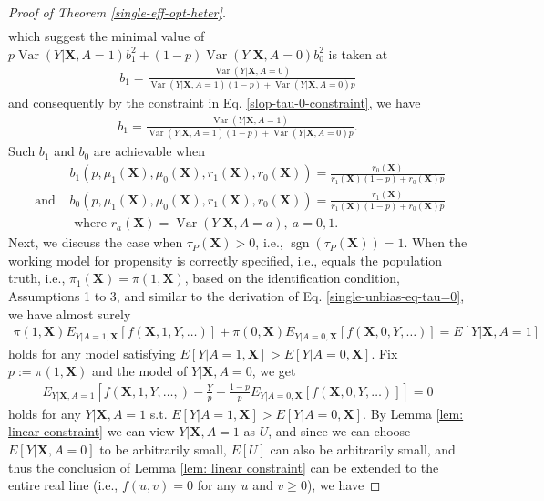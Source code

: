 \documentclass[11pt]{article}
\theoremstyle{referenceplain}
\theoremstyle{referencedefinition}
\theoremstyle{referenceremark}
\begin{document}
\begin{proof}[Proof of Theorem \ref{single-eff-opt-heter}]
\begin{align*}
    \end{align*}
    which suggest the minimal value of $p \operatorname{Var}(Y|\mathbf{X},A=1)b_1^2 + (1-p)\operatorname{Var}(Y|\mathbf{X},A=0)b_0^2$ is taken at
    \begin{align*}
        b_1 = \frac{\operatorname{Var}(Y|\mathbf{X},A=0)}{\operatorname{Var}(Y|\mathbf{X},A=1)(1-p)+\operatorname{Var}(Y|\mathbf{X},A=0)p}
    \end{align*}
    and consequently by the constraint in Eq. \eqref{slop-tau-0-constraint}, we have
    \begin{align*}
         b_1 = \frac{\operatorname{Var}(Y|\mathbf{X},A=1)}{\operatorname{Var}(Y|\mathbf{X},A=1)(1-p)+\operatorname{Var}(Y|\mathbf{X},A=0)p}.
    \end{align*}
Such $b_1$ and $b_0$ are achievable when
\begin{align*}
        &b_1(p,\mu_1(\mathbf{X}),\mu_0(\mathbf{X}),r_1(\mathbf{X}),r_0(\mathbf{X})) =  \frac{r_0(\mathbf{X})}{r_1(\mathbf{X}) (1-p)+r_0(\mathbf{X}) p}\\
        \text{ and }&b_0(p,\mu_1(\mathbf{X}),\mu_0(\mathbf{X}),r_1(\mathbf{X}),r_0(\mathbf{X})) =  \frac{r_1(\mathbf{X})}{r_1(\mathbf{X}) (1-p)+r_0(\mathbf{X}) p}\\
        &\text{ where }r_a(\mathbf{X}) = \operatorname{Var}(Y|\mathbf{X},A=a),~a=0,1.
\end{align*}
Next, we discuss the case when $\tau_P(\mathbf{X})>0$, i.e., $\operatorname{sgn}\left(\tau_P\left(\mathbf{X}\right)\right)=1$. When the working model for propensity is correctly specified, i.e., equals the population truth, i.e., $\pi_1(\mathbf{X}) = \pi(1,\mathbf{X})$, based on the identification condition, Assumptions 1 to 3, and similar to the derivation of Eq. \eqref{single-unbias-eq-tau=0}, we have almost surely 
\begin{align}\label{single-unbias-eq-tau>0}
   \pi(1,\mathbf{X})E_{Y|A=1,\mathbf{X}}[ f(\mathbf{X},1,Y,\dots)] + \pi(0,\mathbf{X}) E_{Y|A=0,\mathbf{X}}[ f(\mathbf{X},0,Y,\dots)] = E[Y|\mathbf{X},A=1]
\end{align}
holds for any model satisfying $E[Y|A=1,\mathbf{X}] > E[Y|A=0,\mathbf{X}]$. Fix $p:= \pi(1,\mathbf{X})$ and the model of $Y|\mathbf{X},A=0$, we get
\begin{align}
    E_{Y|\mathbf{X},A=1}\left[f(\mathbf{X},1,Y,\dots,)-\frac{Y}{p} + \frac{1-p}{p}E_{Y|A=0,\mathbf{X}}[ f(\mathbf{X},0,Y,\dots)]\right]=0
\end{align}
holds for any  $Y|\mathbf{X},A=1$ s.t. $E[Y|A=1,\mathbf{X}] > E[Y|A=0,\mathbf{X}]$. By Lemma \ref{lem: linear constraint} we can view $Y|\mathbf{X},A=1$ as $U$,  and since we can choose $E[Y|\mathbf{X},A=0]$ to be arbitrarily small, $E[U]$ can also be arbitrarily small, and thus the conclusion of Lemma \ref{lem: linear constraint} can be extended to the entire real line (i.e., $f(u,v)=0$ for any $u$ and $v\ge 0$), we have

\end{proof}
\end{document}

